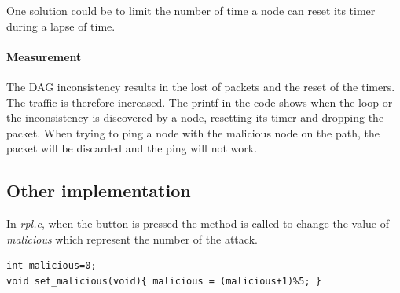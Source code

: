 \documentclass[11pt]{report}
\begin{document}
One solution could be to limit the number of time a node can reset its timer during a lapse of time. 


\paragraph{Measurement}
The DAG inconsistency results in the lost of packets and the reset of
the timers. The traffic is therefore increased. The printf in the code
shows when the loop or the inconsistency is discovered by a node,
resetting its timer and dropping the packet. When trying to ping a node
with the malicious node on the path, the packet will be discarded and
the ping will not work. 

\subsection{Other implementation}
In \textit{rpl.c}, when the button is pressed the method is called to
change the value of \textit{malicious} which represent the number of the
attack.

\begin{lstlisting}
int malicious=0;
void set_malicious(void){ malicious = (malicious+1)%5; }
\end{lstlisting}
\end{document}
